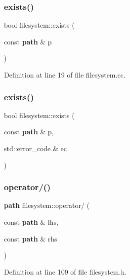 \mbox{\label{namespacefilesystem_a9e291e4379f5f063edd3a37fb623a536}} 
\subsubsection{exists()\hspace{0.1cm}{\footnotesize\ttfamily [1/2]}}
{\footnotesize\ttfamily bool filesystem\+::exists (\begin{DoxyParamCaption}\item[{const \textbf{ path} \&}]{p }\end{DoxyParamCaption})}



Definition at line 19 of file filesystem.\+cc.

\mbox{\label{namespacefilesystem_a5afe12710146c602a4e2b4ba81fcdfe8}} 
\subsubsection{exists()\hspace{0.1cm}{\footnotesize\ttfamily [2/2]}}
{\footnotesize\ttfamily bool filesystem\+::exists (\begin{DoxyParamCaption}\item[{const \textbf{ path} \&}]{p,  }\item[{std\+::error\+\_\+code \&}]{ec }\end{DoxyParamCaption})}

\mbox{\label{namespacefilesystem_a0ddf870f384e61dc7d5e4eebe5661f5e}} 
\subsubsection{operator/()}
{\footnotesize\ttfamily \textbf{ path} filesystem\+::operator/ (\begin{DoxyParamCaption}\item[{const \textbf{ path} \&}]{lhs,  }\item[{const \textbf{ path} \&}]{rhs }\end{DoxyParamCaption})\hspace{0.3cm}{\ttfamily [inline]}}



Definition at line 109 of file filesystem.\+h.

